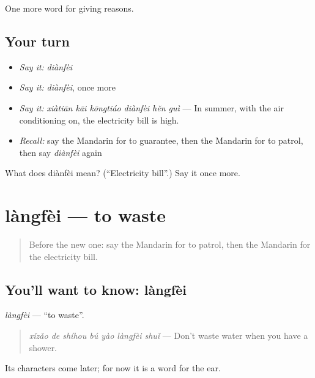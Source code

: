 \begin{grammarlens}[title={What you've built}]
One more word for giving reasons.
\end{grammarlens}

\subsection*{Your turn}
\begin{itemize}
\raggedright
  \item \emph{Say it:} \emph{diànfèi}
  \item \emph{Say it:} \emph{diànfèi}, once more
  \item \emph{Say it:} \emph{xiàtiān kāi kōngtiáo diànfèi hěn guì} — In summer, with the air conditioning on, the electricity bill is high.
  \item \emph{Recall:} say the Mandarin for to guarantee, then the Mandarin for to patrol, then say \emph{diànfèi} again
\end{itemize}

\begin{tcolorbox}[breakable,colback=teal!4,colframe=teal!35!black,title={Before you move on}]
What does diànfèi mean? (\textquotedblleft{}Electricity bill\textquotedblright{}.) Say it once more.
\end{tcolorbox}
\section[làngfèi]{làngfèi — to waste}

\label{lesson:ZH-C383-langfei}



\begin{quote}
Before the new one: say the Mandarin for to patrol, then the Mandarin for the electricity bill.
\end{quote}

\subsection*{You'll want to know: làngfèi}
\emph{làngfèi} — \textquotedblleft{}to waste\textquotedblright{}.

\begin{quote}
\emph{xǐzǎo de shíhou bú yào làngfèi shuǐ} — Don't waste water when you have a shower.
\end{quote}

Its characters come later; for now it is a word for the ear.

